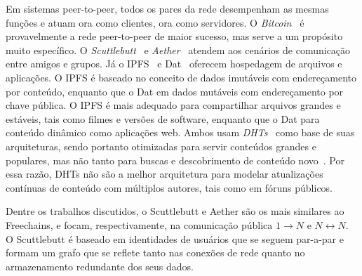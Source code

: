 \documentclass[12pt]{article}
\newcommand{\FC} {Freechains\xspace}
\newcommand{\Xon} {$1{\rightarrow}N$\xspace}
\newcommand{\Xnn} {$N{\leftrightarrow}N$\xspace}
\begin{document}
Em sistemas peer-to-peer, todos os pares da rede desempenham as mesmas funções
e atuam ora como clientes, ora como servidores.
O \emph{Bitcoin}~\cite{p2p.bitcoin} é provavelmente a rede peer-to-peer de
maior sucesso, mas serve a um propósito muito específico.
O \emph{Scuttlebutt}~\cite{p2p.scuttlebutt} e \emph{Aether}~\cite{TODO} atendem
aos cenários de comunicação entre amigos e grupos.
Já o IPFS~\cite{p2p.ipfs} e Dat~\cite{p2p.dat} oferecem hospedagem de arquivos
e aplicações.
O IPFS é baseado no conceito de dados imutáveis com endereçamento por conteúdo,
enquanto que o Dat em dados mutáveis com endereçamento por chave pública.
O IPFS é mais adequado para compartilhar arquivos grandes e estáveis, tais como
filmes e versões de software, enquanto que o Dat para conteúdo dinâmico como
aplicações web.
Ambos usam \emph{DHTs}~\cite{TODO} como base de suas arquiteturas, sendo
portanto otimizadas para servir conteúdos grandes e populares, mas não tanto
para buscas e descobrimento de conteúdo novo~\cite{TODO}.
Por essa razão, DHTs não são a melhor arquitetura para modelar atualizações
contínuas de conteúdo com múltiplos autores, tais como em fóruns públicos.

Dentre os trabalhos discutidos, o Scuttlebutt e Aether são os mais similares ao
\FC, e focam, respectivamente, na comunicação pública \Xon e \Xnn.
O Scuttlebutt é baseado em identidades de usuários que se seguem par-a-par e
formam um grafo que se reflete tanto nas conexões de rede quanto no
armazenamento redundante dos seus dados.
\end{document}
